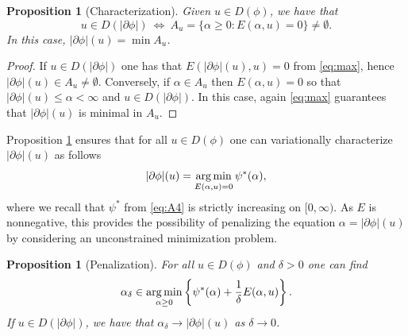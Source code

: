 \documentclass[reqno]{amsart}
\DeclareMathOperator*{\argmin}{{\rm arg\,min}}
\renewcommand{\sl}{|\partial \phi|}
\newtheorem{proposition}[theorem]{Proposition}
\begin{document}
 \begin{proposition}[Characterization]\label{prop:char}
  Given $u\in D(\phi)$, we have that
   $$u \in D(\sl) \ \Leftrightarrow  \  A_u =\{ \alpha \geq 0 : 
   E( \alpha,u) =0\} \not = \emptyset.$$
In this case, $\sl(u)=\min  A_u $. 
 \end{proposition}
 \begin{proof}
   If $u \in D(\sl)$ one has that $ E(\sl(u),u)=0$ from
   \eqref{eq:max}, hence $\sl(u) \in  A_u \not =\emptyset$.  Conversely,   if
   $ \alpha  \in  A_u $ then $ E( \alpha,u)=0$ so that $\sl (u)\leq
   \alpha<\infty$ and $u \in D(\sl)$. In
   this case, again \eqref{eq:max} guarantees that $\sl(u)$ is minimal
   in $ A_u $. 
 \end{proof}
 


 Proposition \ref{prop:char} ensures that for all $u \in D(\phi)$ one can variationally
 characterize $\sl(u)$ as follows
 \begin{equation}\sl(u)  = \argmin_{ E(
   \alpha,u)=0}   \psi^*( \alpha) ,\label{eq:strong}
 \end{equation}
 where we recall that $\psi^*$ from \eqref{eq:A4} is strictly
 increasing on $[0,\infty)$. As $ E$ is nonnegative, this provides the possibility of penalizing the equation
 $\alpha=\sl(u)$ by considering an unconstrained minimization problem.

 \begin{proposition}[Penalization]\label{prop:pen}
     For all $u \in D(\phi)$ and $\delta >0$
   one can find
   \begin{equation}\label{eq:min}
     \alpha_\delta \in \argmin_{\alpha\geq 0}  \left\{\psi^*( \alpha) + \frac1\delta  E(
     \alpha,u) \right\}.
   \end{equation}
   If $u \in D(\sl)$,  we have that $\alpha_\delta \to \sl(u)$ as
   $\delta \to 0$. 
 \end{proposition}
\end{document}
